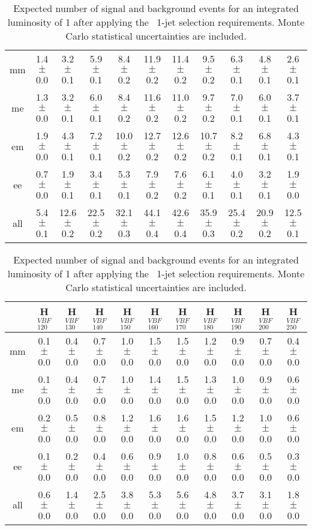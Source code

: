 \begin{table}[!ht]
\begin{center}
{\begin{tabular} {|c|c|c|c|c|c|c|c|c|c|c|}
  \hline
  \hline
  mm &  1.4$\pm$0.0 &  3.2$\pm$0.1 &  5.9$\pm$0.1 &  8.4$\pm$0.2 & 11.9$\pm$0.2 & 11.4$\pm$0.2 &  9.5$\pm$0.2 &  6.3$\pm$0.1 &  4.8$\pm$0.1 &  2.6$\pm$0.1 \\
  me &  1.3$\pm$0.0 &  3.2$\pm$0.1 &  6.0$\pm$0.1 &  8.4$\pm$0.2 & 11.6$\pm$0.2 & 11.0$\pm$0.2 &  9.7$\pm$0.2 &  7.0$\pm$0.1 &  6.0$\pm$0.1 &  3.7$\pm$0.1 \\
  em &  1.9$\pm$0.0 &  4.3$\pm$0.1 &  7.2$\pm$0.1 & 10.0$\pm$0.2 & 12.7$\pm$0.2 & 12.6$\pm$0.2 & 10.7$\pm$0.2 &  8.2$\pm$0.1 &  6.8$\pm$0.1 &  4.3$\pm$0.1 \\
  ee &  0.7$\pm$0.0 &  1.9$\pm$0.1 &  3.4$\pm$0.1 &  5.3$\pm$0.1 &  7.9$\pm$0.2 &  7.6$\pm$0.2 &  6.1$\pm$0.1 &  4.0$\pm$0.1 &  3.2$\pm$0.1 &  1.9$\pm$0.0 \\
  \hline
  all &  5.4$\pm$0.1 & 12.6$\pm$0.2 & 22.5$\pm$0.2 & 32.1$\pm$0.3 & 44.1$\pm$0.4 & 42.6$\pm$0.4 & 35.9$\pm$0.3 & 25.4$\pm$0.2 & 20.9$\pm$0.2 & 12.5$\pm$0.1 \\

 \hline
  \end{tabular}
  }
 {\small
  \begin{tabular} {|c|c|c|c|c|c|c|c|c|c|c|}
  \hline
     &   H$^{VBF}_{120}$ &  H$^{VBF}_{130}$ &    H$^{VBF}_{140}$ &   H$^{VBF}_{150}$ &   H$^{VBF}_{160}$ &   H$^{VBF}_{170}$ &   H$^{VBF}_{180}$ &   H$^{VBF}_{190}$ &   H$^{VBF}_{200}$ &   H$^{VBF}_{250}$ \\
  \hline
  \hline
  mm &  0.1$\pm$0.0 &  0.4$\pm$0.0 &  0.7$\pm$0.0 &  1.0$\pm$0.0 &  1.5$\pm$0.0 &  1.5$\pm$0.0 &  1.2$\pm$0.0 &  0.9$\pm$0.0 &  0.7$\pm$0.0 &  0.4$\pm$0.0 \\
  me &  0.1$\pm$0.0 &  0.4$\pm$0.0 &  0.7$\pm$0.0 &  1.0$\pm$0.0 &  1.4$\pm$0.0 &  1.5$\pm$0.0 &  1.3$\pm$0.0 &  1.0$\pm$0.0 &  0.9$\pm$0.0 &  0.6$\pm$0.0 \\
  em &  0.2$\pm$0.0 &  0.5$\pm$0.0 &  0.8$\pm$0.0 &  1.2$\pm$0.0 &  1.6$\pm$0.0 &  1.6$\pm$0.0 &  1.5$\pm$0.0 &  1.2$\pm$0.0 &  1.0$\pm$0.0 &  0.6$\pm$0.0 \\
  ee &  0.1$\pm$0.0 &  0.2$\pm$0.0 &  0.4$\pm$0.0 &  0.6$\pm$0.0 &  0.9$\pm$0.0 &  1.0$\pm$0.0 &  0.8$\pm$0.0 &  0.6$\pm$0.0 &  0.5$\pm$0.0 &  0.3$\pm$0.0 \\
  \hline
 all &  0.6$\pm$0.0 &  1.4$\pm$0.0 &  2.5$\pm$0.0 &  3.8$\pm$0.0 &  5.3$\pm$0.0 &  5.6$\pm$0.0 &  4.8$\pm$0.0 &  3.7$\pm$0.0 &  3.1$\pm$0.0 &  1.8$\pm$0.0 \\


 \hline
  \end{tabular}
  }
  \caption{Expected number of signal and background events for an 
  integrated luminosity of 1\ifb{} after 
  applying the \ww\ 1-jet selection requirements. Monte Carlo statistical uncertainties are 
  included.}
   \label{tab:wwselection1}
  \end{center}
\end{table}



